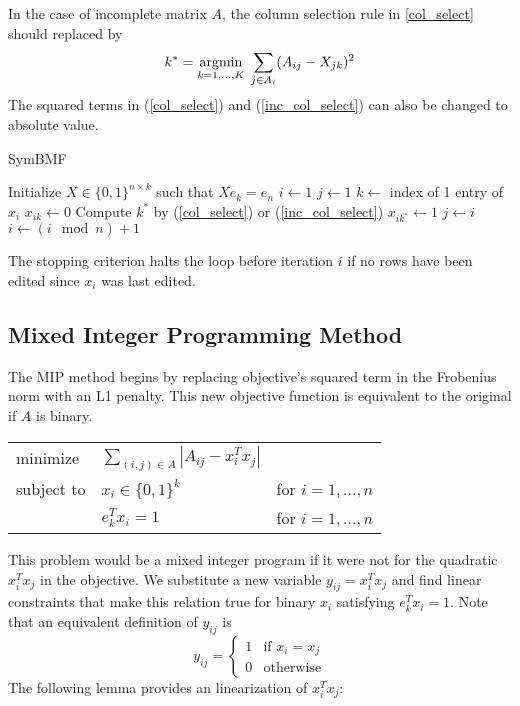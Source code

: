 In the case of incomplete matrix $A$, the column selection rule in
\ref{col_select} should replaced by
\begin{equation} \label{inc_col_select}
k^* = \underset{k = 1,...,K}{\mathrm{arg min}}\; \sum_{j \in A_i} (A_{ij} - X_{jk})^2
\end{equation}
The squared terms in (\ref{col_select}) and (\ref{inc_col_select}) can
also be changed to absolute value.

\begin{algorithm}
\caption{SymBMF}
\begin{algorithmic}[1]
\State Initialize $X \in \{0, 1\}^{n \times k}$ such that $X e_k = e_n$
\State $i \gets 1$
\State $j \gets 1$
\Repeat
  \State $k \gets$ index of 1 entry of $x_i$
  \State $x_{ik} \gets 0$
  \State Compute $k^*$ by (\ref{col_select}) or (\ref{inc_col_select})
  \State $x_{ik^*} \gets 1$
   
    \State $j \gets i$
  \EndIf
  \State $i \gets (i \mod n) + 1$
\end{algorithmic}
\end{algorithm}

The stopping criterion halts the loop before iteration $i$ if no rows
have been edited since $x_i$ was last edited.


\subsection{Mixed Integer Programming Method}

The MIP method begins by replacing objective's squared term in the
Frobenius norm with an L1 penalty. This new objective function is
equivalent to the original if $A$ is binary.
\begin{center}
\begin{tabular}{l l l}
minimize   & $\sum_{(i,j) \in A} |A_{ij} - x_i^T x_j|$ \\
subject to & $x_i \in \{0, 1\}^k$ & for $i = 1, ..., n$ \\
           & $e_k^T x_i = 1$ & for $i = 1, ..., n$
\end{tabular}
\end{center}
This problem would be a mixed integer program if it were not for the
quadratic $x_i^T x_j$ in the objective. We substitute a new variable
$y_{ij} = x_i^T x_j$ and find linear constraints that make this
relation true for binary $x_i$ satisfying $e_k^T x_i = 1$.
Note that an equivalent definition of
$y_{ij}$ is
\[ y_{ij} = \begin{cases}
  1 & \text{if } x_i = x_j \\
  0 & \text{otherwise}
\end{cases}\]
The following lemma provides an linearization of $x_i^T x_j$:

